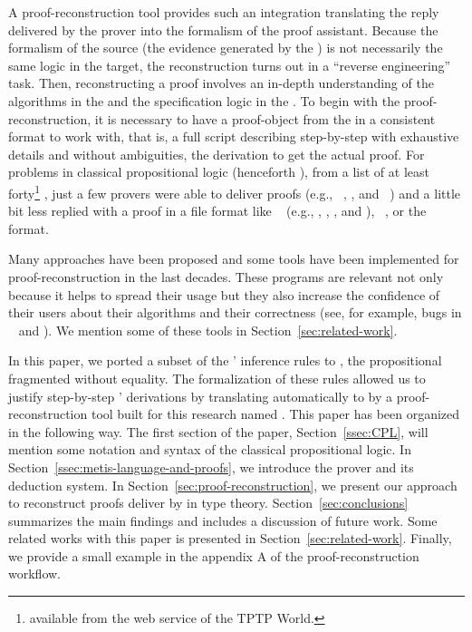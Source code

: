 \documentclass[../main.tex]{subfiles}
\begin{document}
A proof-reconstruction tool provides such an integration translating
the reply delivered by the prover into the formalism of the proof
assistant. Because the formalism of the source (the evidence
generated by the \ATP) is not necessarily the same logic in the
target, the reconstruction turns out in a ``reverse engineering''
task. Then, reconstructing a proof involves an in-depth
understanding of the algorithms in the \ATP and the specification
logic in the \ITP. To begin with the proof-reconstruction, it is
necessary to have a proof-object from the \ATP in a consistent
format to work with, that is, a full script describing step-by-step
with exhaustive details and without ambiguities, the derivation to
get the actual proof.
For problems in classical propositional logic (henceforth \CPL),
from a list of at least forty\footnote{\ATPs available from the web
service  of the TPTP World.} \ATPs, just a few
provers were able to deliver proofs (e.g.,
~\cite{Barrett2011}, , and
~\cite{hillenbrand1997}) and a little bit less replied with
a proof
in a file format like \TSTP~\cite{Sutcliffe-Schulz-Claessen-VanGelder-2006}
(e.g., , \Metis, , and ),
~\cite{Stump2008}, or the ~\cite{Bohme2011} format.

Many approaches have been proposed and some tools have been
implemented for proof-reconstruction in the last decades. These
programs are relevant not only because it helps to spread their
usage but they also increase the confidence of their users about
their algorithms and their correctness (see, for example, bugs in
\ATPs~\cite{Keller2013,Bohme2011,Fleury2014} and
\cite{Kanso2012}).
We mention some of these tools in Section~\ref{sec:related-work}.

In this paper, we ported a subset of the \Metis' inference rules to
\Agda, the propositional fragmented without equality. The formalization of
these rules allowed us to justify step-by-step \Metis' \TSTP derivations by
translating automatically to \Agda by a proof-reconstruction tool built for
this research named \Athena.
This paper has been organized in the following way.
The first section of the paper, Section~\ref{ssec:CPL}, will mention some
notation and syntax of the classical propositional logic.
In Section~\ref{ssec:metis-language-and-proofs}, we introduce the
\Metis prover and its deduction system.
In Section~\ref{sec:proof-reconstruction}, we present our
approach to reconstruct proofs deliver by \Metis in type theory.
Section~\ref{sec:conclusions} summarizes the main findings and includes a
discussion of future work.
Some related works with this paper is presented in Section~\ref{sec:related-work}.
Finally, we provide a small example in the appendix \textsc{A} of the
proof-reconstruction workflow.
\end{document}
